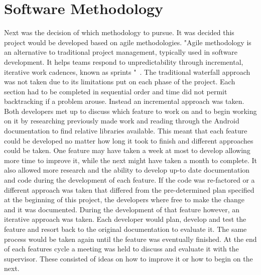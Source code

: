 \section{Software Methodology}
Next was the decision of which methodology to pursue. It was decided this project would be developed based on agile methodologies. "Agile methodology is an alternative to traditional project management, typically used in software development. It helps teams respond to unpredictability through incremental, iterative work cadences, known as sprints "~\cite{agile}. The traditional waterfall approach was not taken due to its limitations put on each phase of the project. Each section had to be completed in sequential order and time did not permit backtracking if a problem arouse. Instead an incremental approach was taken. Both developers met up to discuss which feature to work on and to begin working on it by researching previously made work and reading through the Android documentation to find relative libraries available. This meant that each feature could be developed no matter how long it took to finish and different approaches could be taken. One feature may have taken a week at most to develop allowing  more time to improve it, while the next might have taken a month to complete. It also allowed more research and the ability to develop up-to date documentation and code during the development of each feature. If the code was re-factored or a different approach was taken that differed from the pre-determined plan specified at the beginning of this project, the developers where free to make the change and it was documented. During the development of that feature however, an iterative approach was taken. Each developer would plan, develop and test the feature and resort back to the original documentation to evaluate it. The same process would be taken again until the feature was eventually finished. At the end of each features cycle a meeting was held to discuss and evaluate it with the supervisor. These consisted of ideas on how to improve it or how to begin on the next. 

